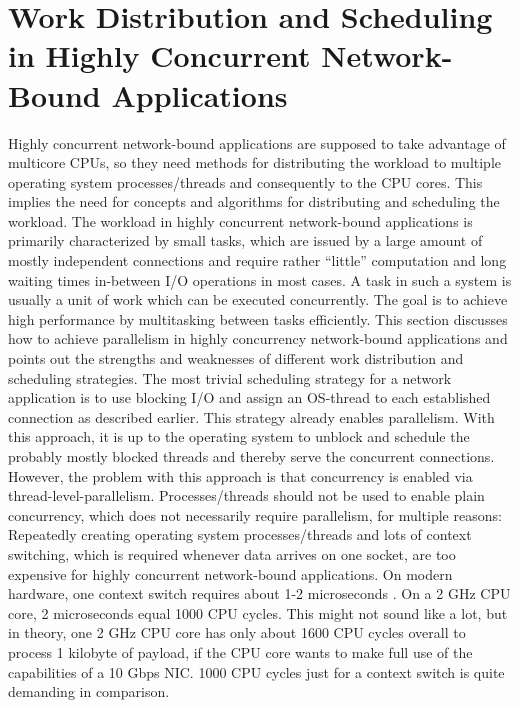 \section{Work Distribution and Scheduling in Highly Concurrent Network-Bound Applications}
Highly concurrent network-bound applications are supposed to take advantage of multicore CPUs, so they need methods for distributing the workload to multiple operating system processes/threads and consequently to the CPU cores. This implies the need for concepts and algorithms for distributing and scheduling the workload.\newline
The workload in highly concurrent network-bound applications is primarily characterized by small tasks, which are issued by a large amount of mostly independent connections and require rather “little” computation and long waiting times in-between I/O operations in most cases. A task in such a system is usually a unit of work which can be executed concurrently. The goal is to achieve high performance by multitasking between tasks efficiently. This section discusses how to achieve parallelism in highly concurrency network-bound applications and points out the strengths and weaknesses of different work distribution and scheduling strategies.\newline
The most trivial scheduling strategy for a network application is to use blocking I/O and assign an OS-thread to each established connection as described earlier. This strategy already enables parallelism. With this approach, it is up to the operating system to unblock and schedule the probably mostly blocked threads and thereby serve the concurrent connections. However, the problem with this approach is that concurrency is enabled via thread-level-parallelism. Processes/threads should not be used to enable plain concurrency, which does not necessarily require parallelism, for multiple reasons: Repeatedly creating operating system processes/threads and lots of context switching, which is required whenever data arrives on one socket, are too expensive for highly concurrent network-bound applications. On modern hardware, one context switch requires about 1-2 microseconds \cite{bendersky:context}. On a 2 GHz CPU core, 2 microseconds equal 1000 CPU cycles. This might not sound like a lot, but in theory, one 2 GHz CPU core has only about 1600 CPU cycles overall to process 1 kilobyte of payload, if the CPU core wants to make full use of the capabilities of a 10 Gbps NIC. 1000 CPU cycles just for a context switch is quite demanding in comparison. \newline
